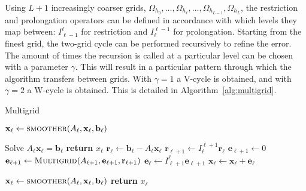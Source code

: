 Using $L + 1$ increasingly coarser grids, $\Omega_{h_0}, \ldots, \Omega_{h_{\ell}}, \ldots, \Omega_{h_{L-1}}, \Omega_{h_L}$, the restriction and prolongation operators can be defined in accordance with which levels they map between: $I_{\ell-1}^\ell$ for restriction and $I_\ell^{\ell-1}$ for prolongation. Starting from the finest grid, the two-grid cycle can be performed recursively to refine the error. The amount of times the recursion is called at a particular level can be chosen with a parameter $\gamma$. This will result in a particular pattern through which the algorithm transfers between grids. With $\gamma = 1$ a V-cycle is obtained, and with $\gamma = 2$ a W-cycle is obtained. This is detailed in Algorithm~\ref{alg:multigrid}.

\begin{algorithm}
	\caption{Multigrid}\label{alg:multigrid}
	\begin{algorithmic}[1]
			\State $\mathbf{x}_\ell \gets \Call{smoother}{A_\ell, \mathbf{x}_\ell, \mathbf{b}_\ell}$ 
		\EndFor

			\State Solve $A_\ell \mathbf{x}_\ell = \mathbf{b}_\ell$ 
			\State \textbf{return} $x_\ell$
		\Else
			\State $\mathbf{r}_\ell \gets \mathbf{b}_\ell - A_\ell \mathbf{x}_\ell$ 
			\State $\mathbf{r}_{\ell+1} \gets I_{\ell}^{\ell + 1} \mathbf{r}_\ell$ 
			\State $\mathbf{e}_{\ell+1} \gets 0$
				\State $\mathbf{e}_{\ell+1} \gets \Call{Multigrid}{A_{\ell+1}, \mathbf{e}_{\ell+1}, \mathbf{r}_{\ell+1}}$ 
			\EndFor
			\State $\mathbf{e}_{\ell} \gets I_{\ell + 1}^{\ell} \mathbf{e}_{\ell+1}$ 
			\State $\mathbf{x}_{\ell} \gets \mathbf{x}_{\ell} + \mathbf{e}_{\ell}$ 
		\EndIf

			\State $\mathbf{x}_\ell \gets \Call{smoother}{A_\ell, \mathbf{x}_\ell, \mathbf{b}_\ell}$ 
		\EndFor
		\State \textbf{return} $x_\ell$
		\EndProcedure
	\end{algorithmic}
\end{algorithm}

